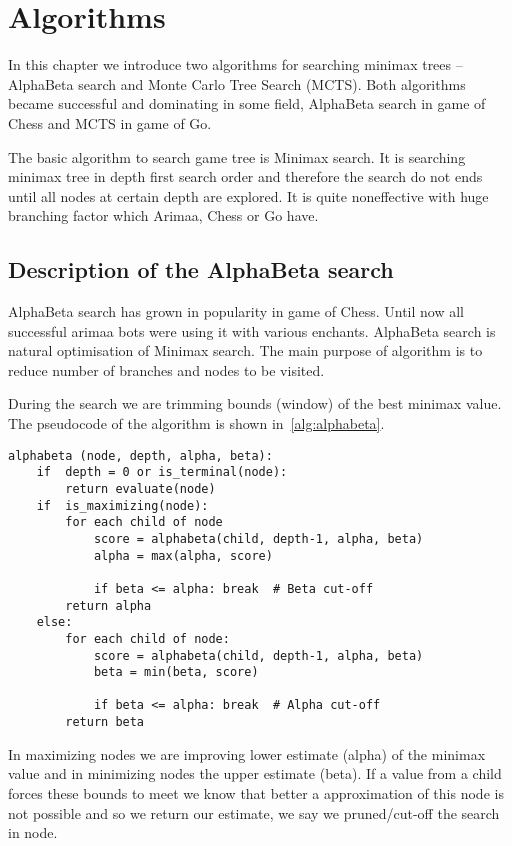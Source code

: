 \chapter{Algorithms}
In this chapter we introduce two algorithms for searching minimax trees --
AlphaBeta search and Monte Carlo Tree Search (MCTS). Both algorithms became
successful and dominating in some field, AlphaBeta search in game of Chess and
MCTS in game of Go.

The basic algorithm to search game tree is Minimax search. It is searching
minimax tree in depth first search order and therefore the search do not ends
until all nodes at certain depth are explored. It is quite noneffective with
huge branching factor which Arimaa, Chess or Go have.

\section{Description of the AlphaBeta search}
AlphaBeta search has grown in popularity in game of Chess. Until now all
successful arimaa bots were using it with various enchants. AlphaBeta search is
natural optimisation of Minimax search. The main purpose of algorithm is to
reduce number of branches and nodes to be visited.

During the search we are trimming bounds (window) of the best minimax value.
The pseudocode of the algorithm is shown in~\ref{alg:alphabeta}.

\lstset{language=Python, caption=Pseudocode of the AlphaBeta search, label=alg:alphabeta}
\begin{lstlisting}
alphabeta (node, depth, alpha, beta):
    if  depth = 0 or is_terminal(node):
        return evaluate(node)
    if  is_maximizing(node):
        for each child of node
            score = alphabeta(child, depth-1, alpha, beta)
            alpha = max(alpha, score)

            if beta <= alpha: break  # Beta cut-off
        return alpha
    else:
        for each child of node:
            score = alphabeta(child, depth-1, alpha, beta)
            beta = min(beta, score)

            if beta <= alpha: break  # Alpha cut-off
        return beta
\end{lstlisting}

In maximizing nodes we are improving lower estimate (alpha) of the minimax
value and in minimizing nodes the upper estimate (beta). If a value from a
child forces these bounds to meet we know that better a approximation of this
node is not possible and so we return our estimate, we say we pruned/cut-off
the search in node.

